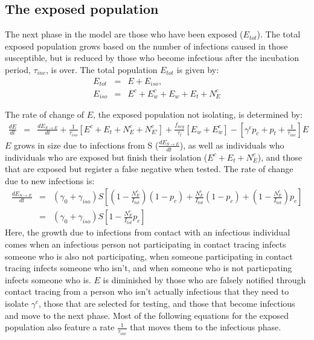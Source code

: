 \documentclass[notitlepage, superscriptaddress]{revtex4-2}
\begin{document}
\subsection{The exposed population}
The next phase in the model are those who have been exposed ($E_{tot}$). The total exposed population grows based on the number of infections caused in those susceptible, but is reduced by those who become infectious after the incubation period, $\tau_{inc}$, is over. The total population $E_{tot}$ is given by:
\begin{eqnarray}
\label{E:Etot}
E_{tot} &=& E + E_{iso}, \\ 
%
E_{iso} &=& E^{c} + E^{c}_{w} + E_{w} + E_{t} + N^{c}_{E}
\end{eqnarray}

The rate of change of $E$, the exposed population not isolating, is determined by:
\begin{eqnarray}
\label{E:dE}
\frac{dE}{dt} &=& \frac{dE_{S \rightarrow E}}{dt}  + \frac{1}{\tau_{iso}}[E^{c} + E_{t} + N^{c}_{E} + N^{c}_{E'}] + \frac{f_{neg}}{\tau_{t}}[E_{w} + E^{c}_{w}] -  [\gamma^{c} p_{c} +p_{t} + \frac{1}{\tau_{inc}}] E
\end{eqnarray}
%
$E$ grows in size due to infections from S ($\frac{dE_{S \rightarrow E}}{dt}$), as well as individuals who individuals who are exposed but finish their isolation ($E^{c} + E_{t} + N^{c}_{E}$), and those that are exposed but register a false negative when tested. The rate of change due to new infections is:
\begin{eqnarray}
\label{E:dE}
\frac{dE_{S \rightarrow E}}{dt} &=& (\gamma_{0} + \gamma_{iso})S \left[ (1 - \frac{N^{c}_{E}}{I_{tot}})  (1 - p_c) + \frac{N^{c}_{E}}{I_{tot}}(1 - p_c) + (1 - \frac{N^{c}_{E}}{I_{tot}}) p_c \right] \\ 
&=& (\gamma_{0} + \gamma_{iso})S \left[ 1 - \frac{N^{c}_{E}}{I_{tot}}  p_c \right]
\end{eqnarray}
 Here, the growth due to infections from contact with an infectious individual comes when an infectious person not participating in contact tracing infects someone who is also not participating, when someone participating in contact tracing infects someone who isn't, and when someone who is not particpating infects someone who is. $E$ is diminished by those who are falsely notified through contact tracing from a person who isn't actually infectious that they need to isolate $\gamma^{c}$, those that are selected for testing, and those that become infectious and move to the next phase. Most of the following equations for the exposed population also feature a rate $\frac{1}{\tau_{inc}}$ that moves them to the infectious phase.
\end{document}
